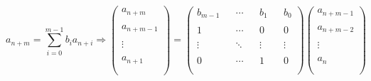 $$
a_{n+m}=\sum_{i=0}^{m-1}b_ia_{n+i}\Rightarrow
\left(
\begin{matrix}
 a_{n+m}    \\\\
 a_{n+m-1}  \\\\
 \vdots     \\\\
 a_{n+1}    \\\\
\end{matrix}
\right)
=
\left(
\begin{matrix}
 b_{m-1} && \cdots && b_1    && b_0    \\\\
 1       && \cdots && 0      && 0      \\\\
 \vdots  && \ddots && \vdots && \vdots \\\\
 0       && \cdots && 1      && 0      \\\\
\end{matrix}
\right)
\left(
\begin{matrix}
 a_{n+m-1} \\\\
 a_{n+m-2} \\\\
 \vdots    \\\\
 a_n       \\\\
\end{matrix}
\right)
$$

